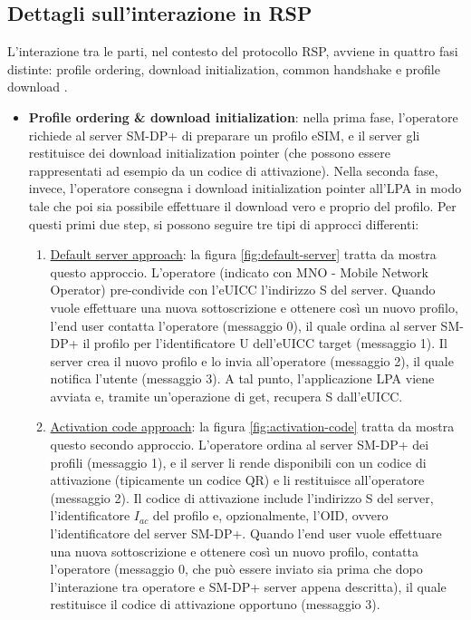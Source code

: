 \documentclass[10pt, twoside, openany]{book}
\begin{document}
\subsection{Dettagli sull'interazione in RSP}\label{sec:RSP-interaction}
L'interazione tra le parti, nel contesto del protocollo RSP, avviene in quattro fasi distinte: profile ordering, download initialization, common handshake e profile download \cite{Sec-analysis}.
\begin{itemize}
\item \textbf{Profile ordering \& download initialization}: nella prima fase, l'operatore richiede al server SM-DP+ di preparare un profilo eSIM, e il server gli restituisce dei download initialization pointer (che possono essere rappresentati ad esempio da un codice di attivazione). Nella seconda fase, invece, l'operatore consegna i download initialization pointer all'LPA in modo tale che poi sia possibile effettuare il download vero e proprio del profilo. Per questi primi due step, si possono seguire tre tipi di approcci differenti:
\begin{enumerate}
\item \underline{Default server approach}: la figura \ref{fig:default-server} tratta da \cite{Sec-analysis} mostra questo approccio. L'operatore (indicato con MNO - Mobile Network Operator) pre-condivide con l'eUICC l'indirizzo S del server. Quando vuole effettuare una nuova sottoscrizione e ottenere così un nuovo profilo, l'end user contatta l'operatore (messaggio 0), il quale ordina al server SM-DP+ il profilo per l'identificatore U dell'eUICC target (messaggio 1). Il server crea il nuovo profilo e lo invia all'operatore (messaggio 2), il quale notifica l'utente (messaggio 3). A tal punto, l'applicazione LPA viene avviata e, tramite un'operazione di get, recupera S dall'eUICC.
\item \underline{Activation code approach}: la figura \ref{fig:activation-code} tratta da \cite{Sec-analysis} mostra questo secondo approccio. L'operatore ordina al server SM-DP+ dei profili (messaggio 1), e il server li rende disponibili con un codice di attivazione (tipicamente un codice QR) e li restituisce all'operatore (messaggio 2). Il codice di attivazione include l'indirizzo S del server, l'identificatore $I_{ac}$ del profilo e, opzionalmente, l'OID, ovvero l'identificatore del server SM-DP+. Quando l'end user vuole effettuare una nuova sottoscrizione e ottenere così un nuovo profilo, contatta l'operatore (messaggio 0, che può essere inviato sia prima che dopo l'interazione tra operatore e SM-DP+ server appena descritta), il quale restituisce il codice di attivazione opportuno (messaggio 3).

\end{enumerate}
\end{itemize}
\end{document}
